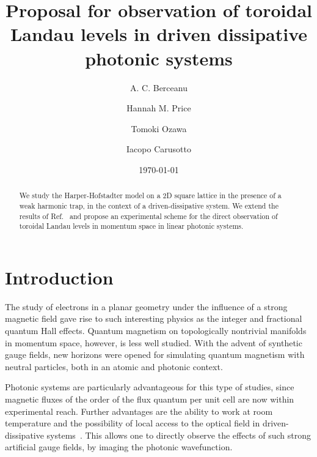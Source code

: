 \documentclass[twocolumn, 10pt, aps, superscriptaddress, floatfix, showpacs, prb, citeautoscript]{revtex4-1}
\newcommand{\co}[2]{#2}
\renewcommand{\paragraph}{\co}
\begin{document}
\title{Proposal for observation of toroidal Landau levels in driven dissipative photonic systems}


\author{A. C. Berceanu}
\author{Hannah M. Price}
\author{Tomoki Ozawa}
\author{Iacopo Carusotto}

\date{\today}

\begin{abstract}
  We study the Harper-Hofstadter model on a 2D square lattice in the
  presence of a weak harmonic trap, in the context of a
  driven-dissipative system. We extend the results of
  Ref.~ and propose an experimental
  scheme for the direct observation of toroidal Landau levels in
  momentum space in linear photonic systems.
\end{abstract}

\maketitle


\section{Introduction}

\paragraph{Quantum magnetism is interesting, even more so in momentum space.}
The study of electrons in a planar geometry under the influence of a
strong magnetic field gave rise to such interesting physics as the
integer and fractional quantum Hall effects. Quantum magnetism on
topologically nontrivial manifolds in momentum space, however, is less
well studied.  With the advent of synthetic gauge fields, new horizons
were opened for simulating quantum magnetism with neutral particles,
both in an atomic and photonic context.

\paragraph{Photonic systems are a good canditate for magnetism.}
Photonic systems are particularly advantageous for this type of
studies, since magnetic fluxes of the order of the flux quantum per
unit cell are now within experimental reach. Further advantages are
the ability to work at room temperature and the possibility of local
access to the optical field in driven-dissipative
systems~\cite{carusotto2013fluids}. This allows one to directly
observe the effects of such strong artificial gauge fields, by imaging
the photonic wavefunction.
\end{document}
